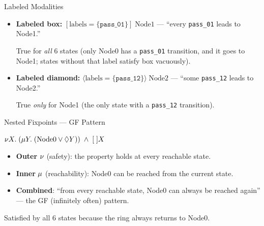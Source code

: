 \begin{frame}[fragile]{Labeled Modalities}
  

  \bigskip
  \begin{itemize}
    \item \textbf{Labeled box:} $[\text{labels} = \{ \texttt{pass\_01} \}]\; \text{Node1}$ --- ``every \texttt{pass\_01} leads to Node1.''

    True for \emph{all} 6 states (only Node0 has a \texttt{pass\_01} transition, and it goes to Node1; states without that label satisfy box vacuously).

    \item \textbf{Labeled diamond:} $\langle \text{labels} = \{ \texttt{pass\_12} \} \rangle\; \text{Node2}$ --- ``some \texttt{pass\_12} leads to Node2.''

    True \emph{only} for Node1 (the only state with a \texttt{pass\_12} transition).
  \end{itemize}
\end{frame}

\begin{frame}[fragile]{Nested Fixpoints --- GF Pattern}
  

  \bigskip
  $\nu X.\; (\mu Y.\; (\text{Node0} \lor \lozenge Y)) \;\land\; [\;] X$

  \begin{itemize}
    \item \textbf{Outer} $\nu$ (safety): the property holds at every reachable state.
    \item \textbf{Inner} $\mu$ (reachability): Node0 can be reached from the current state.
    \item \textbf{Combined}: ``from every reachable state, Node0 can always be reached again'' --- the \alert{GF (infinitely often)} pattern.
  \end{itemize}

  \medskip
  Satisfied by all 6 states because the ring always returns to Node0.
\end{frame}

